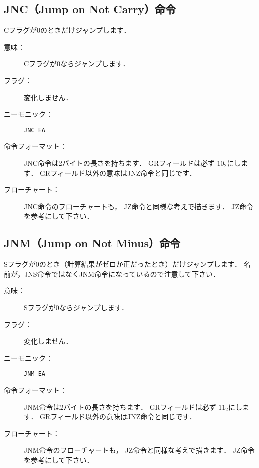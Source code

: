 \subsection{JNC（Jump on Not Carry）命令}
Cフラグが0のときだけジャンプします．

\begin{description}
\item[意味：]Cフラグが0ならジャンプします．

\item[フラグ：]変化しません．

\item[ニーモニック：]\texttt{JNC  EA}

\item[命令フォーマット：]JNC命令は2バイトの長さを持ちます．
  GRフィールドは必ず $10_2$にします．
  GRフィールド以外の意味はJNZ命令と同じです．


\item[フローチャート：]JNC命令のフローチャートも，
  JZ命令と同様な考えで描きます．
  JZ命令を参考にして下さい．

\end{description}

\subsection{JNM（Jump on Not Minus）命令}
Sフラグが0のとき（計算結果がゼロか正だったとき）だけジャンプします．
名前が，JNS命令ではなくJNM命令になっているので注意して下さい．

\begin{description}
\item[意味：]Sフラグが0ならジャンプします．

\item[フラグ：]変化しません．

\item[ニーモニック：]\texttt{JNM  EA}

\item[命令フォーマット：]JNM命令は2バイトの長さを持ちます．
  GRフィールドは必ず $11_2$にします．
  GRフィールド以外の意味はJNZ命令と同じです．


\item[フローチャート：]JNM命令のフローチャートも，
  JZ命令と同様な考えで描きます．
  JZ命令を参考にして下さい．

\end{description}

